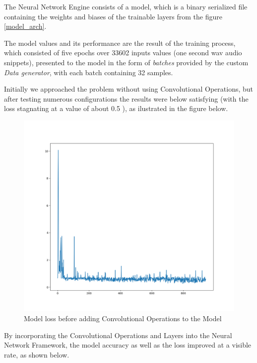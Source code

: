 The Neural Network Engine consists of a model, which is a binary serialized file containing the weights and biases
of the trainable layers from the figure \ref{model_arch}.

The model values and its performance are the result of the training process, which consisted of five epochs over 33602
inputs values (one second wav audio snippets), presented to the model in the form of \textit{batches} provided
by the custom \textit{Data generator}, with each batch containing 32 samples.

Initially we approached the problem without using Convolutional Operations, but after testing numerous configurations
the results were below satisfying (with the loss stagnating at a value of about 0.5 ), as ilustrated in the figure below.


\begin{figure}[H]
	\centering
	\includegraphics[width = 5.5in]{images/badmetricspng.png}
	\caption{Model loss before adding Convolutional Operations to the Model}
\label{bad_metrics}
\end{figure}


By incorporating the Convolutional Operations and Layers into the Neural Network Framework, the model accuracy as well
as the loss improved at a visible rate, as shown below.


